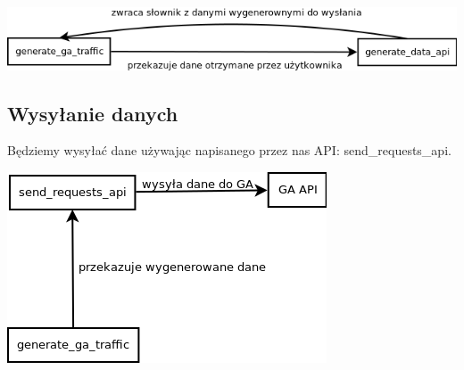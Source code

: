 \documentclass{article}
\begin{document}
\includegraphics[scale=0.5]{generate}

\subsection{Wysyłanie danych}
Będziemy wysyłać dane używając napisanego przez nas API: send\_requests\_api.

\includegraphics[scale=0.5]{connection_ga}
\end{document}
